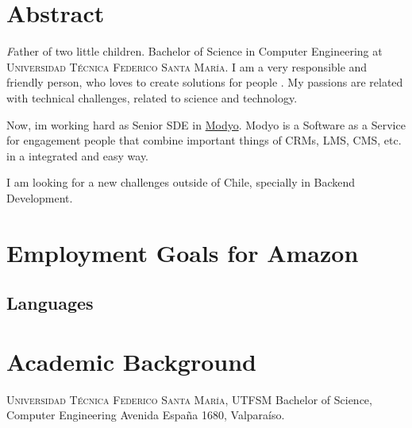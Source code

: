 \documentclass[11pt,letterpaper,roman]{moderncv}
\begin{document}
\maketitle

\section*{\textbf{Abstract}} 
	\textsl Father of two little children. Bachelor of Science in Computer Engineering at
	\textsc{Universidad Técnica Federico Santa María}. I am a very responsible and friendly person, who loves
	to create solutions for people . My passions are related with technical challenges, related to science and technology.

	Now, im working hard as Senior SDE in \href{http://www.modyo.com}{Modyo}. Modyo is a Software as a Service for engagement 
	people that combine important things of CRMs, LMS, CMS, etc. in a integrated and easy way.

	I am looking for a new challenges outside of Chile, specially in Backend Development.

\section{Employment Goals for Amazon}

\subsection{Languages} 

\section{Academic Background}
	{\textsc{Universidad T\'ecnica Federico Santa Mar\'ia, UTFSM}}
	{Bachelor of Science, Computer Engineering}{}
	{}
	{Avenida España 1680, Valparaíso.}
\end{document}
